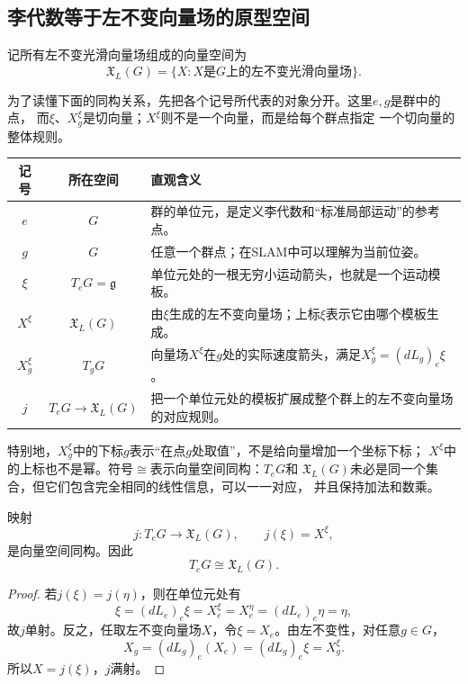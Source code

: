 \subsection{李代数等于左不变向量场的原型空间}

记所有左不变光滑向量场组成的向量空间为
\[
    \mathfrak X_L(G)=\{X:X\text{是}G\text{上的左不变光滑向量场}\}.
\]

为了读懂下面的同构关系，先把各个记号所代表的对象分开。这里$e,g$是群中的点，
而$\xi$、$X_g^\xi$是切向量；$X^\xi$则不是一个向量，而是给每个群点指定
一个切向量的整体规则。
\begin{center}
\renewcommand{\arraystretch}{1.35}
\begin{tabular}{c|c|p{}}
    记号 & 所在空间 & 直观含义 \\
    \hline
    $e$ & $G$ & 群的单位元，是定义李代数和“标准局部运动”的参考点。 \\
    $g$ & $G$ & 任意一个群点；在SLAM中可以理解为当前位姿。 \\
    $\xi$ & $T_eG=\mathfrak g$ & 单位元处的一根无穷小运动箭头，也就是一个运动模板。 \\
    $X^\xi$ & $\mathfrak X_L(G)$ & 由$\xi$生成的左不变向量场；上标$\xi$表示它由哪个模板生成。 \\
    $X_g^\xi$ & $T_gG$ & 向量场$X^\xi$在$g$处的实际速度箭头，满足$X_g^\xi=(dL_g)_e\xi$。 \\
    $j$ & $T_eG\to\mathfrak X_L(G)$ & 把一个单位元处的模板扩展成整个群上的左不变向量场的对应规则。 \\
\end{tabular}
\end{center}

特别地，$X^\xi_g$中的下标$g$表示“在点$g$处取值”，不是给向量增加一个坐标下标；
$X^\xi$中的上标也不是幂。符号$\cong$表示向量空间同构：$T_eG$和
$\mathfrak X_L(G)$未必是同一个集合，但它们包含完全相同的线性信息，可以一一对应，
并且保持加法和数乘。

\begin{theorem}[单位元切空间与左不变向量场]
映射
\[
    j:T_eG\to\mathfrak X_L(G),
    \qquad
    j(\xi)=X^\xi,
\]
是向量空间同构。因此
\[
    T_eG\cong\mathfrak X_L(G).
\]
\end{theorem}

\begin{proof}
若$j(\xi)=j(\eta)$，则在单位元处有
\[
    \xi=(dL_e)_e\xi=X^\xi_e=X^\eta_e=(dL_e)_e\eta=\eta,
\]
故$j$单射。反之，任取左不变向量场$X$，令$\xi=X_e$。由左不变性，对任意$g\in G$，
\[
    X_g=(dL_g)_e(X_e)=(dL_g)_e\xi=X^\xi_g.
\]
所以$X=j(\xi)$，$j$满射。
\end{proof}


